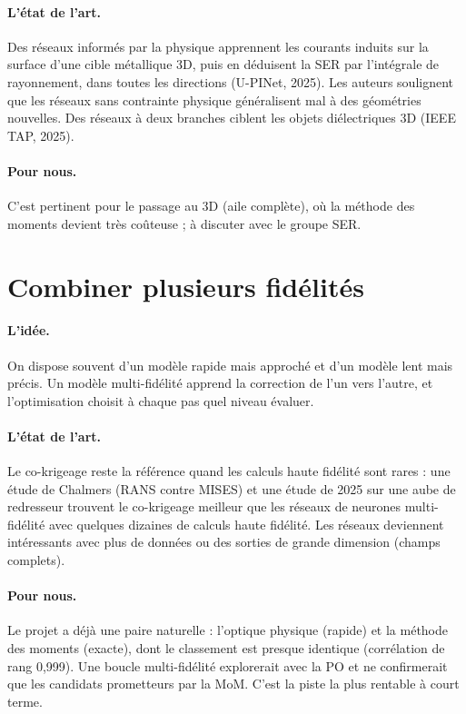 \paragraph{L'état de l'art.} Des réseaux informés par la physique apprennent les courants induits sur la surface d'une cible métallique 3D, puis en déduisent la SER par l'intégrale de rayonnement, dans toutes les directions (U-PINet, 2025). Les auteurs soulignent que les réseaux sans contrainte physique généralisent mal à des géométries nouvelles. Des réseaux à deux branches ciblent les objets diélectriques 3D (IEEE TAP, 2025).
\paragraph{Pour nous.} C'est pertinent pour le passage au 3D (aile complète), où la méthode des moments devient très coûteuse ; à discuter avec le groupe SER.

\section{Combiner plusieurs fidélités}
\paragraph{L'idée.} On dispose souvent d'un modèle rapide mais approché et d'un modèle lent mais précis. Un modèle multi-fidélité apprend la correction de l'un vers l'autre, et l'optimisation choisit à chaque pas quel niveau évaluer.
\paragraph{L'état de l'art.} Le co-krigeage reste la référence quand les calculs haute fidélité sont rares : une étude de Chalmers (RANS contre MISES) et une étude de 2025 sur une aube de redresseur trouvent le co-krigeage meilleur que les réseaux de neurones multi-fidélité avec quelques dizaines de calculs haute fidélité. Les réseaux deviennent intéressants avec plus de données ou des sorties de grande dimension (champs complets).
\paragraph{Pour nous.} Le projet a déjà une paire naturelle : l'optique physique (rapide) et la méthode des moments (exacte), dont le classement est presque identique (corrélation de rang 0,999). Une boucle multi-fidélité explorerait avec la PO et ne confirmerait que les candidats prometteurs par la MoM. C'est la piste la plus rentable à court terme.

